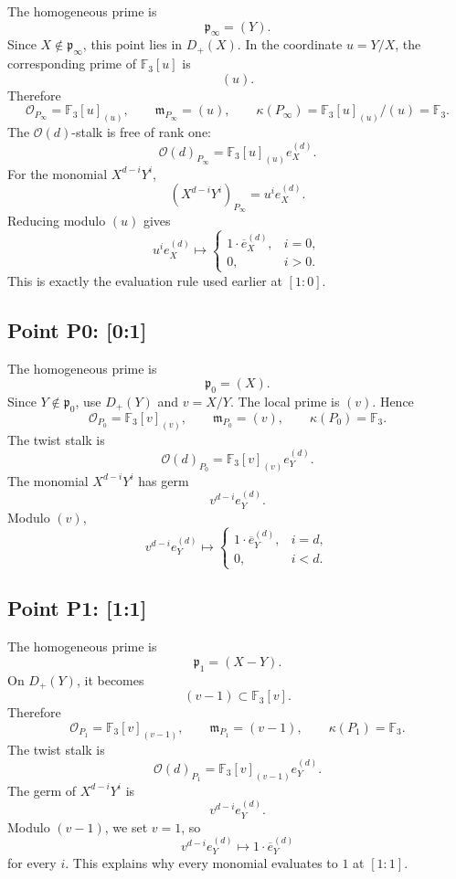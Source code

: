 The homogeneous prime is
\[
  \mathfrak p_\infty=(Y).
\]
Since \(X\notin\mathfrak p_\infty\), this point lies in \(D_+(X)\).  In the
coordinate \(u=Y/X\), the corresponding prime of \(\mathbb F_3[u]\) is
\[
  (u).
\]
Therefore
\[
  \mathcal O_{P_\infty}=\mathbb F_3[u]_{(u)},\qquad
  \mathfrak m_{P_\infty}=(u),\qquad
  \kappa(P_\infty)=\mathbb F_3[u]_{(u)}/(u)=\mathbb F_3.
\]
The \(\mathcal O(d)\)-stalk is free of rank one:
\[
  \mathcal O(d)_{P_\infty}
  =
  \mathbb F_3[u]_{(u)}e_X^{(d)}.
\]
For the monomial \(X^{d-i}Y^i\),
\[
  (X^{d-i}Y^i)_{P_\infty}=u^i e_X^{(d)}.
\]
Reducing modulo \((u)\) gives
\[
  u^i e_X^{(d)}
  \longmapsto
  \begin{cases}
  1\cdot \overline e_X^{(d)},& i=0,\\
  0,& i>0.
  \end{cases}
\]
This is exactly the evaluation rule used earlier at \([1:0]\).

\subsection{Point P0: [0:1]}

The homogeneous prime is
\[
  \mathfrak p_0=(X).
\]
Since \(Y\notin\mathfrak p_0\), use \(D_+(Y)\) and \(v=X/Y\).  The local
prime is \((v)\).  Hence
\[
  \mathcal O_{P_0}=\mathbb F_3[v]_{(v)},\qquad
  \mathfrak m_{P_0}=(v),\qquad
  \kappa(P_0)=\mathbb F_3.
\]
The twist stalk is
\[
  \mathcal O(d)_{P_0}=\mathbb F_3[v]_{(v)}e_Y^{(d)}.
\]
The monomial \(X^{d-i}Y^i\) has germ
\[
  v^{d-i}e_Y^{(d)}.
\]
Modulo \((v)\),
\[
  v^{d-i}e_Y^{(d)}
  \longmapsto
  \begin{cases}
  1\cdot \overline e_Y^{(d)},& i=d,\\
  0,& i<d.
  \end{cases}
\]

\subsection{Point P1: [1:1]}

The homogeneous prime is
\[
  \mathfrak p_1=(X-Y).
\]
On \(D_+(Y)\), it becomes
\[
  (v-1)\subset\mathbb F_3[v].
\]
Therefore
\[
  \mathcal O_{P_1}=\mathbb F_3[v]_{(v-1)},\qquad
  \mathfrak m_{P_1}=(v-1),\qquad
  \kappa(P_1)=\mathbb F_3.
\]
The twist stalk is
\[
  \mathcal O(d)_{P_1}=\mathbb F_3[v]_{(v-1)}e_Y^{(d)}.
\]
The germ of \(X^{d-i}Y^i\) is
\[
  v^{d-i}e_Y^{(d)}.
\]
Modulo \((v-1)\), we set \(v=1\), so
\[
  v^{d-i}e_Y^{(d)}
  \longmapsto
  1\cdot \overline e_Y^{(d)}
\]
for every \(i\).  This explains why every monomial evaluates to \(1\) at
\([1:1]\).


